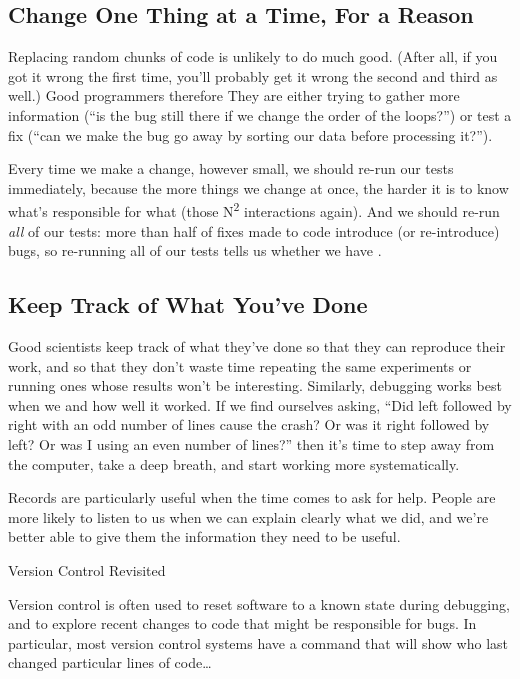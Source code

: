 \subsection*{Change One Thing at a Time, For a Reason}

Replacing random chunks of code is unlikely to do much good. (After all,
if you got it wrong the first time, you'll probably get it wrong the
second and third as well.) Good programmers therefore
 They are either trying to gather more information
(``is the bug still there if we change the order of the loops?'') or
test a fix (``can we make the bug go away by sorting our data before
processing it?'').

Every time we make a change, however small, we should re-run our tests
immediately, because the more things we change at once, the harder it is
to know what's responsible for what (those N\textsuperscript{2}
interactions again). And we should re-run \emph{all} of our tests: more
than half of fixes made to code introduce (or re-introduce) bugs, so
re-running all of our tests tells us whether we have
.

\subsection*{Keep Track of What You've Done}

Good scientists keep track of what they've done so that they can
reproduce their work, and so that they don't waste time repeating the
same experiments or running ones whose results won't be interesting.
Similarly, debugging works best when we
 and how well it worked. If we find ourselves asking,
``Did left followed by right with an odd number of lines cause the
crash? Or was it right followed by left? Or was I using an even number
of lines?'' then it's time to step away from the computer, take a deep
breath, and start working more systematically.

Records are particularly useful when the time comes to ask for help.
People are more likely to listen to us when we can explain clearly what
we did, and we're better able to give them the information they need to
be useful.

\begin{swcbox}{Version Control Revisited}

Version control is often used to reset software to a known state during
debugging, and to explore recent changes to code that might be
responsible for bugs. In particular, most version control systems have a
 command that will show who last changed particular lines
of code\ldots{}

\end{swcbox}

